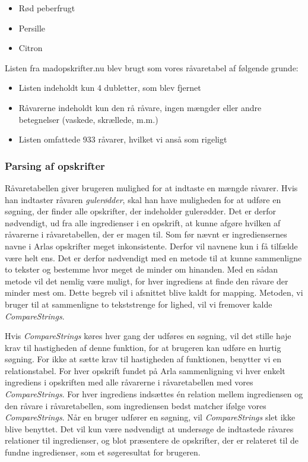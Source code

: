 \begin{itemize}
\item Rød peberfrugt
\item Persille
\item Citron
\end{itemize}

Listen fra madopskrifter.nu blev brugt som vores råvaretabel af følgende grunde:

\begin{itemize}
\item Listen indeholdt kun 4 dubletter, som blev fjernet
\item Råvarerne indeholdt kun den rå råvare, ingen mængder eller andre betegnelser (vaskede, skrællede, m.m.)
\item Listen omfattede 933 råvarer, hvilket vi anså som rigeligt
\end{itemize}

\subsubsection{Parsing af opskrifter}
Råvaretabellen giver brugeren mulighed for at indtaste en mængde råvarer. Hvis han indtaster råvaren \textit{gulerødder}, skal han have muligheden for at udføre en søgning, der finder alle opskrifter, der indeholder gulerødder. Det er derfor nødvendigt, ud fra alle ingredienser i en opskrift, at kunne afgøre hvilken af råvarerne i råvaretabellen, der er magen til. Som før nævnt er ingrediensernes navne i Arlas opskrifter meget inkonsistente. Derfor vil navnene kun i få tilfælde være helt ens. Det er derfor nødvendigt med en metode til at kunne sammenligne to tekster og bestemme hvor meget de minder om hinanden. Med en sådan metode vil det nemlig være muligt, for hver ingrediens at finde den råvare der minder mest om. Dette begreb vil i afsnittet blive kaldt for mapping. Metoden, vi bruger til at sammenligne to tekststrenge for lighed, vil vi fremover kalde \textit{CompareStrings}.

Hvis \textit{CompareStrings} køres hver gang der udføres en søgning, vil det stille høje krav til hastigheden af denne funktion, for at brugeren kan udføre en hurtig søgning. For ikke at sætte krav til hastigheden af funktionen, benytter vi en relationstabel. For hver opskrift fundet på Arla sammenligning vi hver enkelt ingrediens i opskriften med alle råvarerne i råvaretabellen med vores \textit{CompareStrings}. For hver ingrediens indsættes én relation mellem ingrediensen og den råvare i råvaretabellen, som ingrediensen bedst matcher ifølge vores \textit{CompareStrings}. Når en bruger udfører en søgning, vil \textit{CompareStrings} slet ikke blive benyttet. Det vil kun være nødvendigt at undersøge de indtastede råvares relationer til ingredienser, og blot præsentere de opskrifter, der er relateret til de fundne ingredienser, som et søgeresultat for brugeren.


